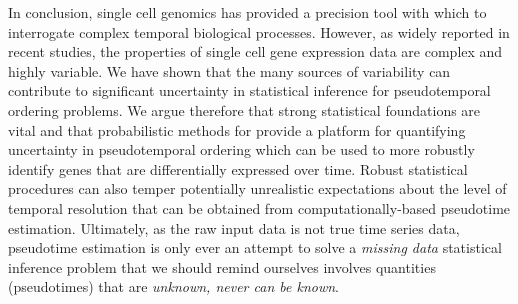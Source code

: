 In conclusion, single cell genomics has provided a precision tool with which to interrogate complex temporal biological processes. However, as widely reported in recent studies, the properties of single cell gene expression data are complex and highly variable. We have shown that the many sources of  variability can contribute to significant uncertainty in statistical inference for pseudotemporal ordering problems. We argue therefore that strong statistical foundations are vital and that probabilistic methods for provide a platform for quantifying uncertainty in pseudotemporal ordering which can be used to more robustly identify genes that are differentially expressed over time. Robust statistical procedures can also temper potentially unrealistic expectations about the level of temporal resolution that can be obtained from computationally-based pseudotime estimation. Ultimately, as the raw input data is not true time series data, pseudotime estimation is only ever an attempt to solve a \emph{missing data} statistical inference problem that we should remind ourselves involves quantities (pseudotimes) that are \emph{unknown, never can be known}.
